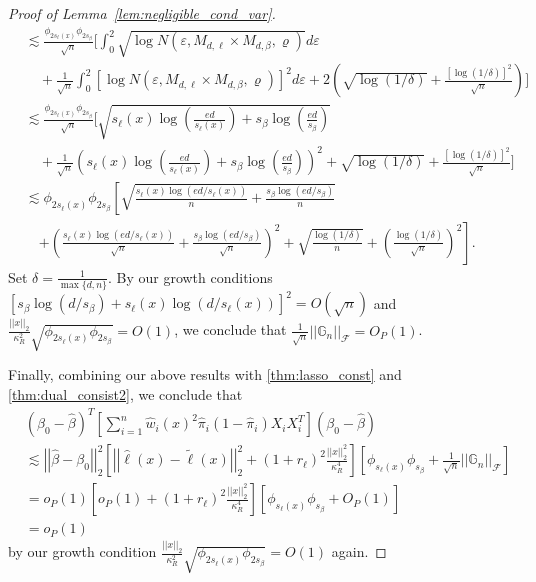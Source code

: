 \documentclass[ejsv2,noshowframe]{imsart}
\theoremstyle{plain}
\theoremstyle{definition}
\theoremstyle{remark}
\newcommand{\norm}[1]{\left|\left| #1 \right|\right|}
\renewcommand{\hat}{\widehat}
\renewcommand{\tilde}{\widetilde}
\begin{document}
\begin{proof}[Proof of Lemma~\ref{lem:negligible_cond_var}]
\begin{align*}
		&\lesssim \frac{\phi_{2s_{\ell}(x)}  \phi_{2s_{\beta}}}{\sqrt{n}}\Biggl[\int_0^2 \sqrt{\log N\left(\varepsilon, M_{d,\ell}\times M_{d,\beta}, \varrho\right)} d\varepsilon \\
		&\quad + \frac{1}{\sqrt{n}} \int_0^2 \left[\log N\left(\varepsilon, M_{d,\ell}\times M_{d,\beta}, \varrho\right)\right]^2 d\varepsilon + 2\left(\sqrt{\log(1/\delta)} + \frac{\left[\log(1/\delta)\right]^2}{\sqrt{n}}\right)\Biggr]\\
		&\lesssim \frac{\phi_{2s_{\ell}(x)}  \phi_{2s_{\beta}}}{\sqrt{n}}  \Biggl[\sqrt{s_{\ell}(x)\log\left(\frac{ed}{s_{\ell}(x)}\right) + s_{\beta}\log\left(\frac{ed}{s_{\beta}}\right)} \\
		&\quad + \frac{1}{\sqrt{n}} \left(s_{\ell}(x)\log\left(\frac{ed}{s_{\ell}(x)}\right) + s_{\beta}\log\left(\frac{ed}{s_{\beta}}\right) \right)^2 + \sqrt{\log(1/\delta)} + \frac{\left[\log(1/\delta)\right]^2}{\sqrt{n}}\Biggr]\\
		&\lesssim \phi_{2s_{\ell}(x)} \phi_{2s_{\beta}} \left[\sqrt{ \frac{s_{\ell}(x)\log(ed/s_{\ell}(x)) }{n} + \frac{s_\beta\log(ed/s_\beta ) }{n} } \right. \\
		&\quad \left. +  \left(\frac{s_{\ell}(x)\log(ed/s_{\ell}(x)) }{\sqrt{n}} + \frac{s_\beta\log(ed/s_\beta ) }{\sqrt{n}}\right)^2 + \sqrt{\frac{\log(1/\delta)}{n}} + \left(\frac{\log(1/\delta)}{\sqrt{n}} \right)^2\right].
	\end{align*}
	Set $\delta = \frac{1}{\max\{d,n\}}$. By our growth conditions $\left[s_{\beta} \log(d/s_{\beta}) + s_{\ell}(x) \log(d/s_{\ell}(x))\right]^2 =O\left(\sqrt{n}\right)$ and $\frac{\norm{x}_2}{\kappa_R^2}\sqrt{\phi_{2s_{\ell}(x)} \phi_{2s_{\beta}}} = O(1)$, we conclude that $\frac{1}{\sqrt{n}}\norm{\mathbb{G}_n}_{\mathcal{F}} = O_P(1)$.
	
	Finally, combining our above results with \autoref{thm:lasso_const} and \autoref{thm:dual_consist2}, we conclude that
	\begin{align*}
		&\left(\beta_0 - \hat{\beta}\right)^T \left[\sum_{i=1}^n \hat{w}_i(x)^2\hat{\pi}_i\left(1-\hat{\pi}_i\right)X_iX_i^T \right] \left(\beta_0 - \hat{\beta}\right)\\
		&\lesssim \norm{\hat{\beta}-\beta_0}_2^2 \left[\norm{\hat{\ell}(x) -\tilde{\ell}(x)}_2^2 + (1+r_{\ell})^2 \frac{\norm{x}_2^2}{\kappa_R^4}\right]\left[\phi_{s_{\ell}(x)} \phi_{s_{\beta}} + \frac{1}{\sqrt{n}}\norm{\mathbb{G}_n}_{\mathcal{F}} \right]\\
		&=o_P(1) \left[o_P(1) + (1+r_{\ell})^2 \frac{\norm{x}_2^2}{\kappa_R^4}\right] \left[\phi_{s_{\ell}(x)} \phi_{s_{\beta}} + O_P(1)\right]\\
		&=o_P(1)
	\end{align*}
	by our growth condition $\frac{\norm{x}_2}{\kappa_R^2}\sqrt{\phi_{2s_{\ell}(x)} \phi_{2s_{\beta}}} = O(1)$ again.
\end{proof}
\end{document}
